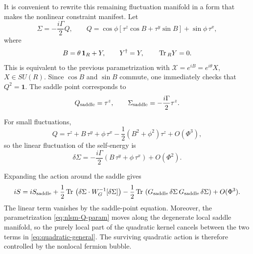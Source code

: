 \documentclass[aps,prx,preprint,amsmath,amssymb]{revtex4-2}
\newcommand{\Tr}{{\rm \, Tr\,}}
\begin{document}
It is convenient to rewrite this remaining fluctuation manifold in a form that
makes the nonlinear constraint manifest.  Let
\begin{equation}\label{eq:nlsm-Q-param}
\Sigma=-\frac{i\Gamma}{2}Q,
\qquad
Q=\cos\phi\left[\tau^z\cos B+\tau^y\sin B\right]+\sin\phi\,\tau^x,
\end{equation}
where
\begin{equation}\label{eq:B-theta-Y}
B=\theta\,\mathbf{1}_R+Y,
\qquad
Y^\dagger=Y,
\qquad
\Tr_R Y=0.
\end{equation}
This is equivalent to the previous parametrization with
\(\mathcal X=e^{iB}=e^{i\theta}X\), \(X\in SU(R)\).  Since \(\cos B\) and
\(\sin B\) commute, one immediately checks that \(Q^2=\mathbf{1}\).  The saddle
point corresponds to
\begin{equation}\label{eq:Q-saddle}
Q_{\rm saddle}=\tau^z,
\qquad
\Sigma_{\rm saddle}=-\frac{i\Gamma}{2}\tau^z.
\end{equation}

For small fluctuations,
\begin{equation}\label{eq:Q-small-expand}
Q
=
\tau^z
+B\,\tau^y
+\phi\,\tau^x
-\frac{1}{2}\left(B^2+\phi^2\right)\tau^z
+O(\Phi^3),
\end{equation}
so the linear fluctuation of the self-energy is
\begin{equation}\label{eq:deltaSigma-linear}
\delta\Sigma
=
-\frac{i\Gamma}{2}\left(B\,\tau^y+\phi\,\tau^x\right)+O(\Phi^2).
\end{equation}

Expanding the action around the saddle gives
\begin{equation}\label{eq:quadratic-general}
iS
=
iS_{\rm saddle}
+\frac{1}{2}\Tr\left(\delta\Sigma\cdot W_G^{-1}[\delta\Sigma]\right)
-\frac{1}{2}\Tr\left(G_{\rm saddle}\,\delta\Sigma\,G_{\rm saddle}\,\delta\Sigma\right)
+O(\Phi^3).
\end{equation}
The linear term vanishes by the saddle-point equation.  Moreover, the
parametrization \eqref{eq:nlsm-Q-param} moves along the degenerate local saddle
manifold, so the purely local part of the quadratic kernel cancels between the
two terms in \eqref{eq:quadratic-general}.  The surviving quadratic action is
therefore controlled by the nonlocal fermion bubble.
\end{document}
